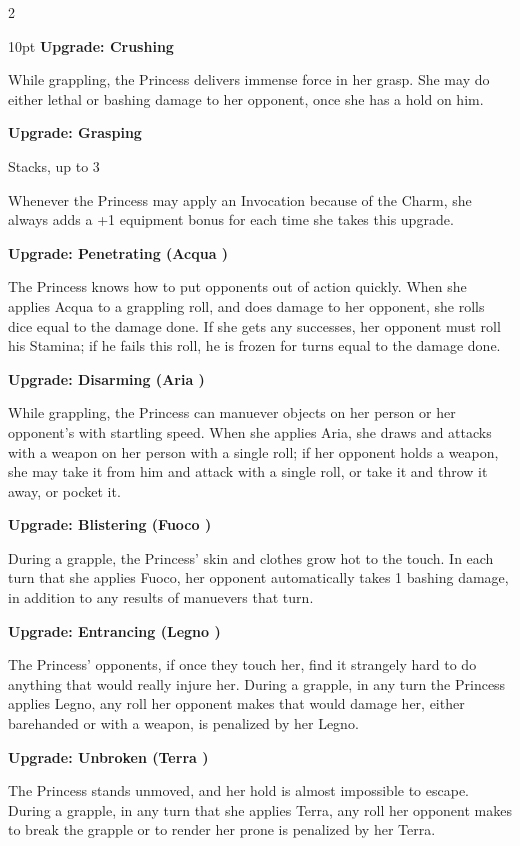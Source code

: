 \begin{multicols}{2}
\begin{myindentpar}{10pt}
\textbf{Upgrade: Crushing}

While grappling, the Princess delivers immense force in her grasp. She may do either lethal or bashing damage to her opponent, once she has a hold on him.

\textbf{Upgrade: Grasping}

Stacks, up to 3

Whenever the Princess may apply an Invocation because of the Charm, she always adds a +1 equipment bonus for each time she takes this upgrade.

\textbf{Upgrade: Penetrating (Acqua \textbullet\textbullet)}

The Princess knows how to put opponents out of action quickly. When she applies Acqua to a grappling roll, and does damage to her opponent, she rolls dice equal to the damage done. If she gets any successes, her opponent must roll his Stamina; if he fails this roll, he is frozen for turns equal to the damage done.

\textbf{Upgrade: Disarming (Aria \textbullet\textbullet)}

While grappling, the Princess can manuever objects on her person or her opponent's with startling speed. When she applies Aria, she draws and attacks with a weapon on her person with a single roll; if her opponent holds a weapon, she may take it from him and attack with a single roll, or take it and throw it away, or pocket it.

\textbf{Upgrade: Blistering (Fuoco \textbullet\textbullet)}

During a grapple, the Princess' skin and clothes grow hot to the touch. In each turn that she applies Fuoco, her opponent automatically takes 1 bashing damage, in addition to any results of manuevers that turn.

\textbf{Upgrade: Entrancing (Legno \textbullet\textbullet)}

The Princess' opponents, if once they touch her, find it strangely hard to do anything that would really injure her. During a grapple, in any turn the Princess applies Legno, any roll her opponent makes that would damage her, either barehanded or with a weapon, is penalized by her Legno.

\textbf{Upgrade: Unbroken (Terra \textbullet\textbullet)}

The Princess stands unmoved, and her hold is almost impossible to escape. During a grapple, in any turn that she applies Terra, any roll her opponent makes to break the grapple or to render her prone is penalized by her Terra.


\end{myindentpar}
\end{multicols}
